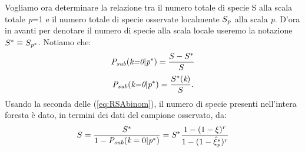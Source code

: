Vogliamo ora determinare la relazione tra il numero totale di specie S alla scala totale \emph{p}=1 e il numero totale di specie osservate localmente $S_\emph{p}$ alla scala \emph{p}.
D'ora in avanti per denotare il numero di specie alla scala locale useremo la notazione $S^*\equiv S_{\emph{p}^*}$.
Notiamo che:
\begin{equation}
\emph{P}_\emph{sub}(\emph{k=0}|\emph{p}^*)=\frac{S-S^*}{S}
\end{equation}
\begin{equation}
    \emph{P}_\emph{sub}(\emph{k=0}|\emph{p}^*)=\frac{S^*(\emph{k})}{S}.
\end{equation}
Usando la seconda delle (\ref{eq:RSAbinom}), il numero di specie presenti nell'intera foresta è dato, in termini dei dati del campione osservato, da:
\begin{equation}
S=\frac{S^*}{1-\emph{P}_\emph{sub}(\emph{k}=0|\emph{p}^*)}=S^*\frac{1-(1-\xi)^r}{1-(1-\hat \xi_{\emph{p}}^*)^r}
\label{eq:upscaleNB}
\end{equation}
%
%
%
%
